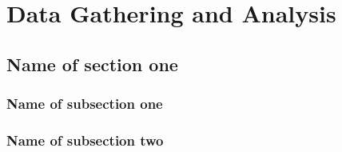 \chapter{Data Gathering and Analysis}

\lipsum[4]

\section{Name of section one}

\lipsum

\subsection{Name of subsection one}

\lipsum

\subsection{Name of subsection two}

\lipsum


